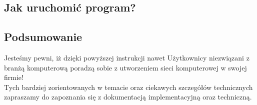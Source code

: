 \subsection{Jak uruchomić program?}

\subsection{Podsumowanie}
Jesteśmy pewni, iż dzięki powyższej instrukcji nawet Użytkownicy niezwiązani z branżą komputerową poradzą sobie z utworzeniem sieci komputerowej w swojej firmie!\\
\indent Tych bardziej zorientowanych w temacie oraz ciekawych szczegółów technicznych zapraszamy do zapoznania się z dokumentacją implementacyjną oraz techniczną.